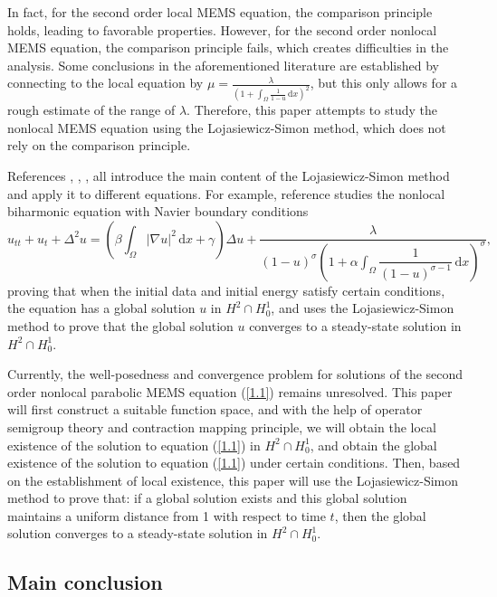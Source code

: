 \documentclass{article}
\numberwithin{equation}{section}
\begin{document}
In fact, for the second order local MEMS equation, the comparison principle holds, leading to favorable properties. However, for the second order nonlocal MEMS equation, the comparison principle fails, which creates difficulties in the analysis. Some conclusions in the aforementioned literature are established by connecting to the local equation by $\mu=\frac{\lambda}{(1+\int_{\Omega}\frac{1}{1-u}\,\mathrm{d}x)^2}$, but this only allows for a rough estimate of the range of $\lambda$. Therefore, this paper attempts to study the nonlocal MEMS equation using the Lojasiewicz-Simon method, which does not rely on the comparison principle.

References \cite{ref13}, \cite{ref9}, \cite{ref16}, \cite{ref8} all introduce the main content of the Lojasiewicz-Simon method and apply it to different equations. For example, reference \cite{ref16} studies the nonlocal biharmonic equation with Navier boundary conditions
$$u_{tt}+u_{t}+\Delta^2 u=\left(\beta \int_{\Omega}|\nabla u|^2\,\mathrm{d}x+\gamma\right)\Delta u+\frac{\lambda}{(1-u)^\sigma\left(1+\alpha\int_{\Omega}\dfrac{1}{(1-u)^{\sigma-1}}\,\mathrm{d}x\right)^\sigma},$$
proving that when the initial data and initial energy satisfy certain conditions, the equation has a global solution $u$ in $H^2\cap H_0^1$, and uses the Lojasiewicz-Simon method to prove that the global solution $u$ converges to a steady-state solution in $H^2\cap H_0^1$.

Currently, the well-posedness and convergence problem for solutions of the second order nonlocal parabolic MEMS equation (\ref{1.1}) remains unresolved. This paper will first construct a suitable function space, and with the help of operator semigroup theory and contraction mapping principle, we will obtain the local existence of the solution to equation (\ref{1.1}) in $H^2\cap H_0^1$, and obtain the global existence of the solution to equation (\ref{1.1}) under certain conditions. Then, based on the establishment of local existence, this paper will use the Lojasiewicz-Simon method to prove that: if a global solution exists and this global solution maintains a uniform distance from 1 with respect to time $t$, then the global solution converges to a steady-state solution in $H^2\cap H_0^1$.

\subsection{Main conclusion}
\end{document}
